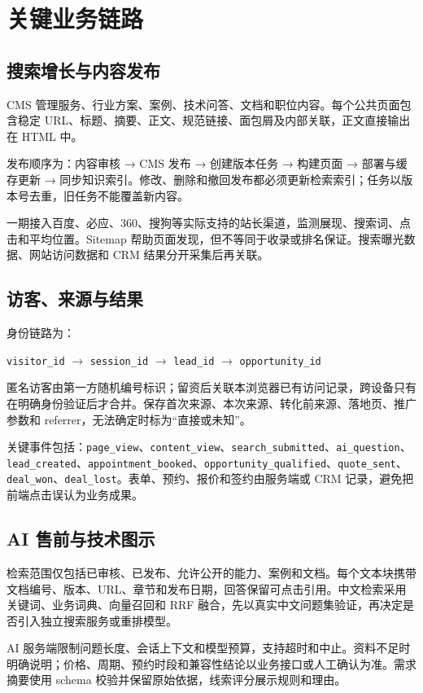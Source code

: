 \documentclass[UTF8,zihao=-4,a4paper]{ctexart}
\begin{document}
\section{关键业务链路}

\subsection{搜索增长与内容发布}
CMS 管理服务、行业方案、案例、技术问答、文档和职位内容。每个公共页面包含稳定 URL、标题、摘要、正文、规范链接、面包屑及内部关联，正文直接输出在 HTML 中。

发布顺序为：内容审核 → CMS 发布 → 创建版本任务 → 构建页面 → 部署与缓存更新 → 同步知识索引。修改、删除和撤回发布都必须更新检索索引；任务以版本号去重，旧任务不能覆盖新内容。

一期接入百度、必应、360、搜狗等实际支持的站长渠道，监测展现、搜索词、点击和平均位置。Sitemap 帮助页面发现，但不等同于收录或排名保证。搜索曝光数据、网站访问数据和 CRM 结果分开采集后再关联。

\subsection{访客、来源与结果}
身份链路为：
\begin{center}
\texttt{visitor\_id} $\rightarrow$ \texttt{session\_id} $\rightarrow$ \texttt{lead\_id} $\rightarrow$ \texttt{opportunity\_id}
\end{center}
匿名访客由第一方随机编号标识；留资后关联本浏览器已有访问记录，跨设备只有在明确身份验证后才合并。保存首次来源、本次来源、转化前来源、落地页、推广参数和 referrer，无法确定时标为“直接或未知”。

关键事件包括：\texttt{page\_view}、\texttt{content\_view}、\texttt{search\_submitted}、\texttt{ai\_question}、\texttt{lead\_created}、\texttt{appointment\_booked}、\texttt{opportunity\_qualified}、\texttt{quote\_sent}、\texttt{deal\_won}、\texttt{deal\_lost}。表单、预约、报价和签约由服务端或 CRM 记录，避免把前端点击误认为业务成果。

\subsection{AI 售前与技术图示}
检索范围仅包括已审核、已发布、允许公开的能力、案例和文档。每个文本块携带文档编号、版本、URL、章节和发布日期，回答保留可点击引用。中文检索采用关键词、业务词典、向量召回和 RRF 融合，先以真实中文问题集验证，再决定是否引入独立搜索服务或重排模型。

AI 服务端限制问题长度、会话上下文和模型预算，支持超时和中止。资料不足时明确说明；价格、周期、预约时段和兼容性结论以业务接口或人工确认为准。需求摘要使用 schema 校验并保留原始依据，线索评分展示规则和理由。
\end{document}
